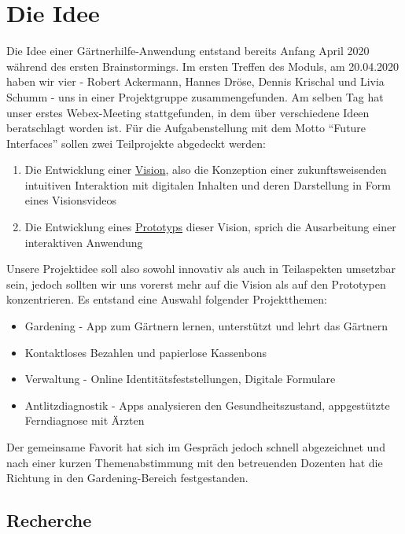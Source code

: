 \hypertarget{die-idee}{%
\section{Die Idee}\label{die-idee}}

Die Idee einer Gärtnerhilfe-Anwendung entstand bereits Anfang April 2020
während des ersten Brainstormings. Im ersten Treffen des Moduls, am
20.04.2020 haben wir vier - Robert Ackermann, Hannes Dröse, Dennis
Krischal und Livia Schumm - uns in einer Projektgruppe zusammengefunden.
Am selben Tag hat unser erstes Webex-Meeting stattgefunden, in dem über
verschiedene Ideen beratschlagt worden ist. Für die Aufgabenstellung mit
dem Motto ``Future Interfaces'' sollen zwei Teilprojekte abgedeckt
werden:

\begin{enumerate}
\def\labelenumi{\arabic{enumi}.}
\tightlist
\item
  Die Entwicklung einer \protect\hyperlink{vision}{Vision}, also die
  Konzeption einer zukunftsweisenden intuitiven Interaktion mit
  digitalen Inhalten und deren Darstellung in Form eines Visionsvideos
\item
  Die Entwicklung eines \protect\hyperlink{prototyp}{Prototyps} dieser
  Vision, sprich die Ausarbeitung einer interaktiven Anwendung
\end{enumerate}

Unsere Projektidee soll also sowohl innovativ als auch in Teilaspekten
umsetzbar sein, jedoch sollten wir uns vorerst mehr auf die Vision als
auf den Prototypen konzentrieren. Es entstand eine Auswahl folgender
Projektthemen:

\begin{itemize}
\tightlist
\item
  Gardening - App zum Gärtnern lernen, unterstützt und lehrt das
  Gärtnern
\item
  Kontaktloses Bezahlen und papierlose Kassenbons
\item
  Verwaltung - Online Identitätsfeststellungen, Digitale Formulare
\item
  Antlitzdiagnostik - Apps analysieren den Gesundheitszustand,
  appgestützte Ferndiagnose mit Ärzten
\end{itemize}

Der gemeinsame Favorit hat sich im Gespräch jedoch schnell abgezeichnet
und nach einer kurzen Themenabstimmung mit den betreuenden Dozenten hat
die Richtung in den Gardening-Bereich festgestanden.

\hypertarget{recherche}{%
\subsection{Recherche}\label{recherche}}

